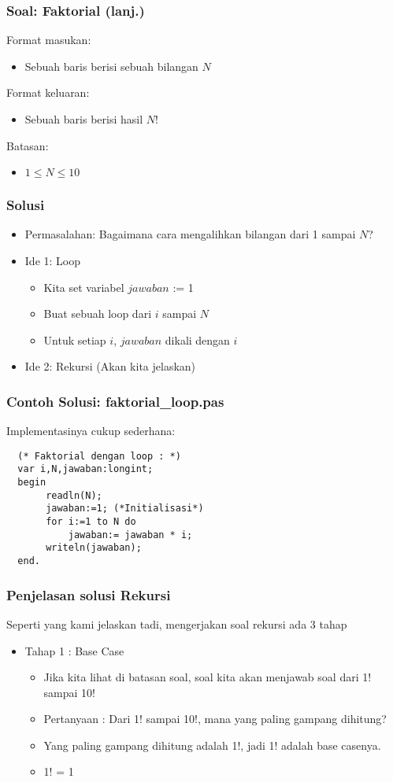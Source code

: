 \documentclass{beamer}
\begin{document}
\begin{frame}
\frametitle{Soal: Faktorial (lanj.) }
Format masukan:
\begin{itemize}
        \item Sebuah baris berisi sebuah bilangan $N$
\end{itemize}
Format keluaran:
\begin{itemize}
        \item Sebuah baris berisi hasil $N$!
\end{itemize}
Batasan:
\begin{itemize}
        \item $1 \le N \le 10$
\end{itemize}
\end{frame}
 
\begin{frame}
\frametitle{Solusi}
\begin{itemize}
        \item Permasalahan: Bagaimana cara mengalihkan bilangan dari 1 sampai $N$?
    \item Ide 1: Loop
    \begin{itemize}
       \item Kita set variabel $jawaban$ := 1
       \item Buat sebuah loop dari $i$ sampai $N$
       \item Untuk setiap $i$, $jawaban$ dikali dengan $i$
   \end{itemize}
   \item Ide 2: Rekursi (Akan kita jelaskan)   
\end{itemize}
\end{frame}
 
\begin{frame}[fragile]
\frametitle{Contoh Solusi: faktorial\_loop.pas}
Implementasinya cukup sederhana:
\begin{lstlisting}
  (* Faktorial dengan loop : *)
  var i,N,jawaban:longint;
  begin
       readln(N);
       jawaban:=1; (*Initialisasi*)
       for i:=1 to N do
           jawaban:= jawaban * i;
       writeln(jawaban);
  end.
\end{lstlisting}
\end{frame}
 
\begin{frame}
\frametitle{Penjelasan solusi Rekursi}
Seperti yang kami jelaskan tadi, mengerjakan soal rekursi ada 3 tahap
\begin{itemize}
    \item Tahap 1 : Base Case
    \begin {itemize}
        \item Jika kita lihat di batasan soal, soal kita akan menjawab soal dari 1! sampai 10!
        \item Pertanyaan : Dari 1! sampai 10!, mana yang paling gampang dihitung?
        \item Yang paling gampang dihitung adalah 1!, jadi 1! adalah base casenya.
        \item 1! = 1
    \end {itemize}
\end{itemize}
\end{frame} 
 
\end{document}
